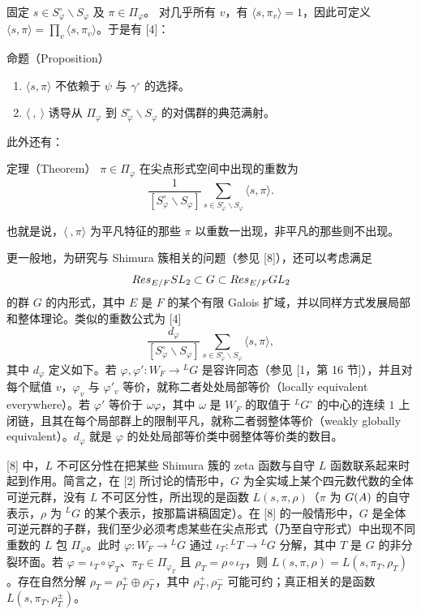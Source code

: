 固定 $s\in S_\varphi^\circ\backslash S_\varphi$ 及 $\pi\in\Pi_\varphi$。
对几乎所有 $v$，有 $\langle s,\pi_v\rangle=1$，因此可定义
$\langle s,\pi\rangle=\prod_v\langle s,\pi_v\rangle$。于是有 [4]：
\begin{originaltheorem}{命题（Proposition）}
\begin{enumerate}
\item[(i)] $\langle s,\pi\rangle$ 不依赖于 $\psi$ 与 $\gamma^\circ$ 的选择。
\item[(ii)] $\langle\ ,\ \rangle$ 诱导从 $\Pi_\varphi$ 到
$S_\varphi^\circ\backslash S_\varphi$ 的对偶群的典范满射。
\end{enumerate}
\end{originaltheorem}
此外还有：
\begin{originaltheorem}{定理（Theorem）}
$\pi\in\Pi_\varphi$ 在尖点形式空间中出现的重数为
\[
\frac{1}{[S_\varphi^\circ\backslash S_\varphi]}
\sum_{s\in S_\varphi^\circ\backslash S_\varphi}\langle s,\pi\rangle.
\]
\end{originaltheorem}
也就是说，$\langle\ ,\pi\rangle$ 为平凡特征的那些 $\pi$ 以重数一出现，非平凡的那些则不出现。

更一般地，为研究与 Shimura 簇相关的问题（参见 [8]），还可以考虑满足
\[
Res_{E/F}SL_2\subset G\subset Res_{E/F}GL_2
\]
的群 $G$ 的内形式，其中 $E$ 是 $F$ 的某个有限 Galois 扩域，并以同样方式发展局部和整体理论。类似的重数公式为 [4]
\[
\frac{d_\varphi}{[S_\varphi^\circ\backslash S_\varphi]}
\sum_{s\in S_\varphi^\circ\backslash S_\varphi}\langle s,\pi\rangle,
\]
其中 $d_\varphi$ 定义如下。若 $\varphi,\varphi':W_F\to{}^LG$ 是容许同态（参见
[1，第 16 节]），并且对每个赋值 $v$，$\varphi_v$ 与 $\varphi'_v$ 等价，就称二者处处局部等价（locally equivalent everywhere）。若 $\varphi'$ 等价于
$\omega\varphi$，其中 $\omega$ 是 $W_F$ 的取值于 ${}^LG^\circ$ 的中心的连续
$1$ 上闭链，且其在每个局部群上的限制平凡，就称二者弱整体等价（weakly globally equivalent）。$d_\varphi$ 就是 $\varphi$ 的处处局部等价类中弱整体等价类的数目。

[8] 中，$L$ 不可区分性在把某些 Shimura 簇的 zeta 函数与自守 $L$ 函数联系起来时起到作用。简言之，在 [2] 所讨论的情形中，$G$ 为全实域上某个四元数代数的全体可逆元群，没有 $L$ 不可区分性，所出现的是函数
$L(s,\pi,\rho)$（$\pi$ 为 $G(A)$ 的自守表示，$\rho$ 为 ${}^LG$ 的某个表示，按那篇讲稿固定）。在 [8] 的一般情形中，$G$ 是全体可逆元群的子群，我们至少必须考虑某些在尖点形式（乃至自守形式）中出现不同重数的 $L$ 包
$\Pi_\varphi$。此时 $\varphi:W_F\to{}^LG$ 通过
$\iota_T:{}^LT\to{}^LG$ 分解，其中 $T$ 是 $G$ 的非分裂环面。若
$\varphi=\iota_T\circ\varphi_T$、$\pi_T\in\Pi_{\varphi_T}$ 且
$\rho_T=\rho\circ\iota_T$，则
$L(s,\pi,\rho)=L(s,\pi_T,\rho_T)$。存在自然分解
$\rho_T=\rho_T^+\oplus\rho_T^-$，其中 $\rho_T^+,\rho_T^-$ 可能可约；真正相关的是函数
$L(s,\pi_T,\rho_T^\pm)$。

